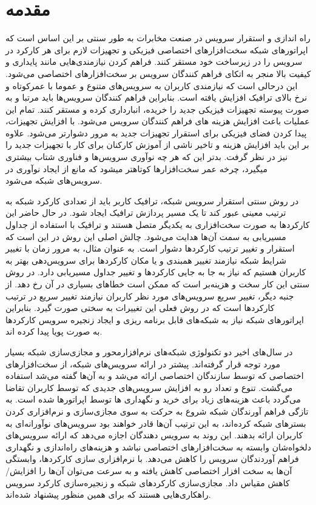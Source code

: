 \chapter{مقدمه}

راه اندازی و استقرار سرویس در صنعت مخابرات به طور سنتی بر این اساس است که اپراتورهای شبکه سخت‌افزارهای اختصاصی فیزیکی و تجهیزات لازم برای هر کارکرد در سرویس را در زیرساخت خود مستقر کنند.
فراهم کردن نیازمندی‌هایی مانند پایداری و کیفیت بالا منجر به اتکای فراهم کنندگان سرویس بر سخت‌افزارهای اختصاصی می‌شود. 
این درحالی است که نیازمندی کاربران به سرویس‌های متنوع و عموما با عمرکوتاه و نرخ بالای ترافیک افزایش یافته است.
بنابراین فراهم کنندگان سرویس‌ها باید مرتبا و به صورت پیوسته تجهیزات فیزیکی جدید را خریده، انبارداری کرده و مستقر کنند.
تمام این عملیات باعث افزایش هزینه های فراهم کنندگان سرویس می‌شود.
با افزایش تجهیزات، پیدا کردن فضای فیزیکی برای استقرار تجهیزات جدید به مرور دشوارتر می‌شود.
علاوه بر این باید افزایش هزینه و تاخیر ناشی از آموزش کارکنان برای کار با تجهیزات جدید را نیز در نظر گرفت.
بدتر این که هر چه نوآوری سرویس‌ها و فناوری شتاب بیشتری می‍گیرد، چرخه عمر سخت‌افزارها کوتاه‍تر می‍شود که مانع از ایجاد نوآوری در سرویس‌های شبکه می‌شود.

در روش سنتی استقرار سرویس شبکه، ترافیک کاربر باید از تعدادی کارکرد شبکه به ترتیب معینی عبور کند تا یک مسیر پردازش ترافیک ایجاد شود.
در حال حاضر این کارکردها به صورت سخت‌افزاری به یکدیگر متصل هستند و ترافیک با استفاده از جداول مسیریابی به سمت آن‌ها هدایت می‌شود.
چالش اصلی این روش در این است که استقرار و تغییر ترتیب کارکردها دشوار است.
به عنوان مثال، به مرور زمان با تغییر شرایط شبکه نیازمند تغییر همبندی و یا مکان کارکردها برای سرویس‌دهی بهتر به کاربران هستیم که نیاز به جا به جایی کارکردها و تغییر جداول مسیریابی دارد.
در روش سنتی این کار سخت و هزینه‌بر است که ممکن است خطاهای بسیاری در آن رخ دهد.
از جنبه دیگر، تغییر سریع سرویس‌های مورد نظر کاربران نیازمند تغییر سریع در ترتیب کارکردها است که در روش فعلی این تغییرات به سختی صورت گیرد.
بنابراین اپراتورهای شبکه نیاز به شبکه‌های قابل برنامه ریزی و ایجاد زنجیره سرویس کارکردها به صورت پویا پیدا کرده اند.

در سال‌های اخیر دو تکنولوژی شبکه‌های نرم‌افزارمحور و مجازی‌سازی شبکه بسیار مورد توجه قرار گرفته‌اند.
پیشتر در ارائه سرویس‌های شبکه، از سخت‌افزارهای اختصاصی که توسط سازندگان اختصاصی ارائه می‌شد و به آن‌ها
گفته می‌شد استفاده می‌گشت.
تنوع و تعداد رو به افزایش سرویس‌های جدیدی که توسط کاربران تقاضا می‌گردد
باعث هزینه‌های زیاد برای خرید و نگهداری
‌ها
توسط اپراتورها شده است.
به تازگی فراهم آورندگان شبکه
شروع به حرکت به سوی مجازی‌سازی و نرم‌افزاری کردن بسترهای شبکه کرده‌اند،
به این ترتیب آن‌ها قادر خواهند بود
سرویس‌های نوآورانه‌ای به کاربران ارائه بدهند.
این روند به سرویس دهندگان اجازه می‌دهد که ارائه سرویس‌های دلخواه‌شان وابسته به سخت‌افزارهای اختصاصی نباشد و 
هزینه‌های راه‌اندازی و نگهداری فراهم آوردندگان سرویس را کاهش می‌دهد.
با نرم‌افزاری سازی کارکردها، وابستگی آن‌ها به سخت افزار اختصاصی کاهش یافته و به سرعت می‌توان آن‌ها را افزایش/کاهش مقیاس داد.
مجازی‌سازی کارکردهای شبکه و زنجیره‌سازی کارکرد سرویس‌ راهکاری‌هایی هستند که برای همین منظور پیشنهاد شده‌اند.

